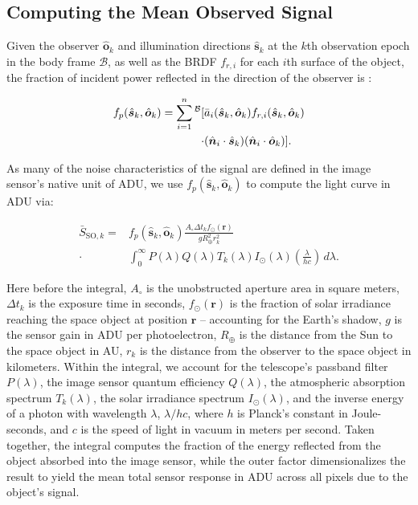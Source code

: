 \documentclass[a4paper,twocolumn]{spaceDebrisC} %
\newcommand{\vctr}[1]{\bm{#1}}
\newcommand{\unitv}[1]{\hat{\vctr{#1}}}
\newcommand{\preup}[1]{\prescript{#1}{}{}}
\newcommand{\rf}[1]{\mathcal{\MakeUppercase{#1}}}
\newcommand{\prf}[1]{\preup{\rf{#1}}}
\begin{document}
\subsection{Computing the Mean Observed Signal}

Given the observer $\unitv{o}_k$ and illumination directions $\unitv{s}_k$ at the $k$th observation epoch in the body frame $\mathcal{B}$, as well as the BRDF $f_{r,i}$ for each $i$th surface of the object, the fraction of incident power reflected in the direction of the observer is \cite{fan2020thesis}:

\begin{equation} \label{eq:lc_norm}
  \begin{split} 
 f_p(\unitv{s}_k, \unitv{o}_k) = \sum_{i=1}^n\prf{B}[&\bar{a}_i(\unitv{s}_k, \unitv{o}_k) f_{r,i}(\unitv{s}_k, \unitv{o}_k) \\ \cdot &(\unitv{n}_i \cdot \unitv{s}_k) (\unitv{n}_i \cdot \unitv{o}_k)]. 
  \end{split} 
\end{equation}

As many of the noise characteristics of the signal are defined in the image sensor's native unit of ADU, we use $f_p(\unitv{s}_k, \unitv{o}_k)$ to compute the light curve in ADU via:

\begin{equation} \label{eq:general_bright}
  \begin{split} 
 \bar{S}_{\text{SO},k} = &f_p(\unitv{s}_k, \unitv{o}_k) \frac{A_\circ \Delta t_k f_\odot(\vctr{r})}{g R_\oplus^2 r_k^2} \\ \cdot &\int_{0}^{\infty}{P(\lambda)Q(\lambda)T_k(\lambda) I_\odot(\lambda) \left(\frac{\lambda}{hc}\right)}\,d\lambda. 
  \end{split}
\end{equation}

Here before the integral, $A_\circ$ is the unobstructed aperture area in square meters, $\Delta t_k$ is the exposure time in seconds, $f_\odot(\vctr{r})$ is the fraction of solar irradiance reaching the space object at position $\vctr{r}$ -- accounting for the Earth's shadow, $g$ is the sensor gain in ADU per photoelectron, $R_\oplus$ is the distance from the Sun to the space object in AU, $r_k$ is the distance from the observer to the space object in kilometers. Within the integral, we account for the telescope's passband filter $P(\lambda)$, the image sensor quantum efficiency $Q(\lambda)$, the atmospheric absorption spectrum $T_k(\lambda)$, the solar irradiance spectrum $I_\odot(\lambda)$, and the inverse energy of a photon with wavelength $\lambda$, $\lambda / hc$, where $h$ is Planck's constant in Joule-seconds, and $c$ is the speed of light in vacuum in meters per second. Taken together, the integral computes the fraction of the energy reflected from the object absorbed into the image sensor, while the outer factor dimensionalizes the result to yield the mean total sensor response in ADU across all pixels due to the object's signal.
\end{document}
